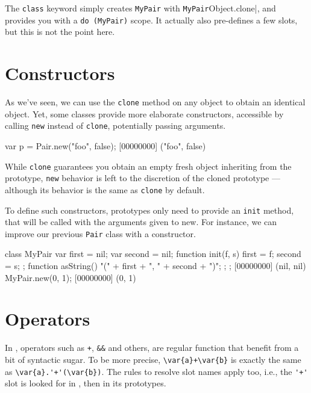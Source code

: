 The \lstinline{class} keyword simply creates \lstinline|MyPair| with
\lstinline|MyPair|Object.clone|, and provides you with a \lstinline|do
(MyPair)| scope. It actually also pre-defines a few slots, but this is not
the point here.

\section{Constructors}
\label{sec:tut:ctor}
As we've seen, we can use the \lstinline|clone| method on any object to
obtain an identical object. Yet, some classes provide more elaborate
constructors, accessible by calling \lstinline{new} instead of
\lstinline{clone}, potentially passing arguments.

\begin{urbiscript}[firstnumber=1]
var p = Pair.new("foo", false);
[00000000] ("foo", false)
\end{urbiscript}

While \lstinline{clone} guarantees you obtain an empty fresh object
inheriting from the prototype, \lstinline{new} behavior is left to the
discretion of the cloned prototype --- although its behavior is the same as
\lstinline{clone} by default.

To define such constructors, prototypes only need to provide an
\lstinline{init} method, that will be called with the arguments given to
new. For instance, we can improve our previous \lstinline{Pair} class with a
constructor.

\begin{urbiscript}[firstnumber=1]
class MyPair
{
  var first = nil;
  var second = nil;
  function init(f, s) { first = f;   second = s;  };
  function asString() { "(" + first + ", " + second + ")"; };
};
[00000000] (nil, nil)
MyPair.new(0, 1);
[00000000] (0, 1)
\end{urbiscript}

\section{Operators}
\label{sec:tut:operators}

In \us, operators such as \lstinline|+|, \lstinline|&&| and others,
are regular function that benefit from a bit of syntactic sugar.  To
be more precise, \lstinline|\var{a}+\var{b}| is exactly the same as
\lstinline|\var{a}.'+'(\var{b})|.  The rules to resolve slot names
apply too, i.e., the \lstinline|'+'| slot is looked for in ,
then in its prototypes.

